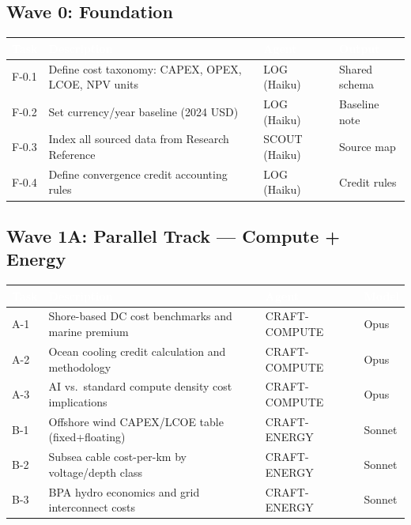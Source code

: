 \documentclass[11pt,letterpaper]{article}
\newcommand{\tableheader}[1]{\textbf{\sffamily\textcolor{white}{#1}}}
\begin{document}
\subsection{Wave 0: Foundation}

\begin{center}
\begin{tabularx}{\textwidth}{L{2.5cm}L{4cm}C{1.5cm}X}
\toprule
{}
\tableheader{Task} & \tableheader{Description} & \tableheader{Agent} & \tableheader{Output} \\
\midrule
F-0.1 & Define cost taxonomy: CAPEX, OPEX, LCOE, NPV units & LOG (Haiku) & Shared schema \\
F-0.2 & Set currency/year baseline (2024 USD) & LOG (Haiku) & Baseline note \\
F-0.3 & Index all sourced data from Research Reference & SCOUT (Haiku) & Source map \\
F-0.4 & Define convergence credit accounting rules & LOG (Haiku) & Credit rules \\
\bottomrule
\end{tabularx}
\end{center}

\subsection{Wave 1A: Parallel Track --- Compute + Energy}

\begin{center}
\begin{tabularx}{\textwidth}{L{2cm}L{5cm}C{1.5cm}X}
\toprule
{}
\tableheader{Task} & \tableheader{Description} & \tableheader{Agent} & \tableheader{Model} \\
\midrule
A-1 & Shore-based DC cost benchmarks and marine premium & CRAFT-COMPUTE & Opus \\
A-2 & Ocean cooling credit calculation and methodology & CRAFT-COMPUTE & Opus \\
A-3 & AI vs.\ standard compute density cost implications & CRAFT-COMPUTE & Opus \\
B-1 & Offshore wind CAPEX/LCOE table (fixed+floating) & CRAFT-ENERGY & Sonnet \\
B-2 & Subsea cable cost-per-km by voltage/depth class & CRAFT-ENERGY & Sonnet \\
B-3 & BPA hydro economics and grid interconnect costs & CRAFT-ENERGY & Sonnet \\
\bottomrule
\end{tabularx}
\end{center}
\end{document}
